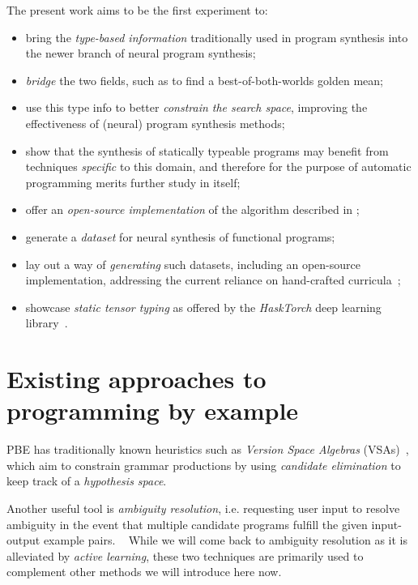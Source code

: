 \documentclass{article}
\begin{document}
The present work aims to be the first experiment to:
\begin{itemize}
    \item bring the \emph{type-based information} traditionally used in program synthesis into the newer branch of neural program synthesis;
    \item \emph{bridge} the two fields, such as to find a best-of-both-worlds golden mean;
    \item use this type info to better \emph{constrain the search space}, improving the effectiveness of (neural) program synthesis methods;
    \item show that the synthesis of statically typeable programs may benefit from techniques \emph{specific} to this domain, and therefore for the purpose of automatic programming merits further study in itself;
    \item offer an \emph{open-source implementation} of the algorithm described in \citet{nsps};
    \item generate a \emph{dataset} for neural synthesis of functional programs;
    \item lay out a way of \emph{generating} such datasets, including an open-source implementation, addressing the current reliance on hand-crafted curricula~\citep{nps};
    \item showcase \emph{static tensor typing} as offered by the \emph{HaskTorch} deep learning library~\citep{hasktorch}.
\end{itemize}


\section{Existing approaches to programming by example}

PBE has traditionally known heuristics such as
\emph{Version Space Algebras} (VSAs)~\citep{mitchell1982generalization},
which aim to constrain grammar productions by using
\emph{candidate elimination} to keep track of a \emph{hypothesis space}.

Another useful tool is \emph{ambiguity resolution},
i.e. requesting user input to resolve ambiguity
in the event that multiple candidate programs
fulfill the given input-output example pairs.%
~\citep{gulwani2017program}
While we will come back to ambiguity resolution as it is
alleviated by \emph{active learning},
these two techniques are primarily used to complement
other methods we will introduce here now.
\end{document}
